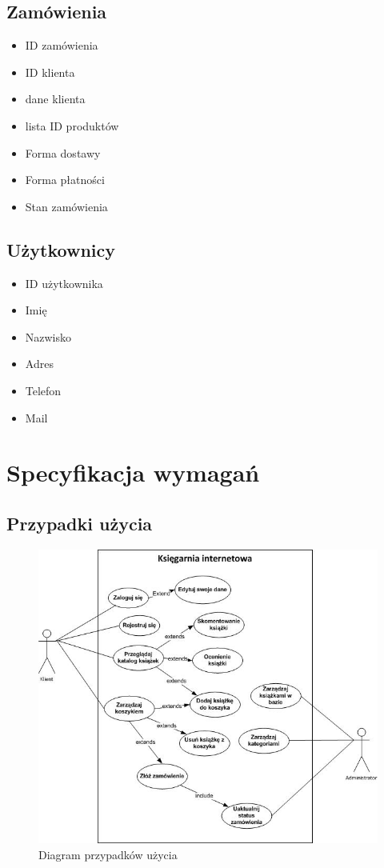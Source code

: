\documentclass[pdflatex,11pt]{aghdpl}
\begin{document}
\section{Zamówienia}
\begin{itemize}
\item ID zamówienia
\item ID klienta
\item dane klienta
\item lista ID produktów
\item Forma dostawy
\item Forma płatności
\item Stan zamówienia
\end{itemize}

\section{Użytkownicy}
\begin{itemize}
\item ID użytkownika
\item Imię
\item Nazwisko
\item Adres
\item Telefon
\item Mail
\end{itemize}



\chapter{Specyfikacja wymagań}

\section{Przypadki użycia}

\begin{figure}[hbt]
\centering
\includegraphics[width=\textwidth]{useCase}
\caption{Diagram przypadków użycia}
\label{fig:useCase}
\end{figure}
\end{document}
